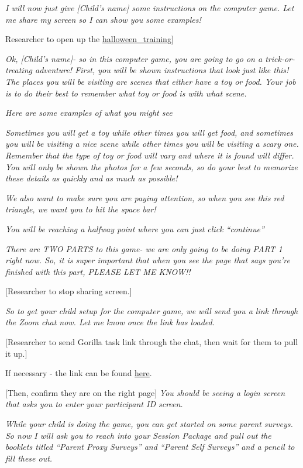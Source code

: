 \documentclass[]{book}
\begin{document}
\emph{I will now just give {[}Child's name{]} some instructions on the computer game. Let me share my screen so I can show you some examples!}

Researcher to open up the \href{}{halloween\_training}{]}

\emph{Ok, {[}Child's name{]}- so in this computer game, you are going to go on a trick-or-treating adventure! First, you will be shown instructions that look just like this! The places you will be visiting are scenes that either have a toy or food. Your job is to do their best to remember what toy or food is with what scene.}

\emph{Here are some examples of what you might see}

\emph{Sometimes you will get a toy while other times you will get food, and sometimes you will be visiting a nice scene while other times you will be visiting a scary one. Remember that the type of toy or food will vary and where it is found will differ. You will only be shown the photos for a few seconds, so do your best to memorize these details as quickly and as much as possible!}

\emph{We also want to make sure you are paying attention, so when you see this red triangle, we want you to hit the space bar!}

\emph{You will be reaching a halfway point where you can just click ``continue''}

\emph{There are TWO PARTS to this game- we are only going to be doing PART 1 right now. So, it is super important that when you see the page that says you're finished with this part, PLEASE LET ME KNOW!!}

{[}Researcher to stop sharing screen.{]}

\emph{So to get your child setup for the computer game, we will send you a link through the Zoom chat now. Let me know once the link has loaded.}

{[}Researcher to send Gorilla task link through the chat, then wait for them to pull it up.{]}

If necessary - the link can be found \href{https://research.sc/participant/login/20451/publicid}{here}.

{[}Then, confirm they are on the right page{]} \emph{You should be seeing a login screen that asks you to enter your participant ID screen.}

\emph{While your child is doing the game, you can get started on some parent surveys. So now I will ask you to reach into your Session Package and pull out the booklets titled ``Parent Proxy Surveys'' and ``Parent Self Surveys'' and a pencil to fill these out.}
\end{document}
